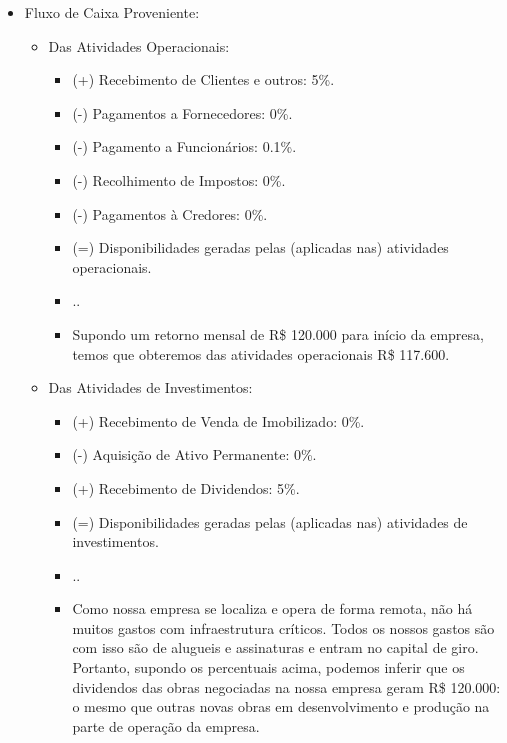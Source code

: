 \documentclass[onecolumn,12pt]{asme2ej}
\begin{document}
\begin{itemize}

    \item Fluxo de Caixa Proveniente:
    \begin{itemize}
    
        \item Das Atividades Operacionais:
        \begin{itemize}
            \item (+) Recebimento de Clientes e outros: 5\%.
            \item (-) Pagamentos a Fornecedores: 0\%.
            \item (-) Pagamento a Funcionários: 0.1\%.
            \item (-) Recolhimento de Impostos: 0\%.
            \item (-) Pagamentos à Credores: 0\%.
            \item (=) Disponibilidades geradas pelas (aplicadas nas) atividades operacionais.
            \item ..
            \item Supondo um retorno mensal de R\$ 120.000 para início da empresa, temos que obteremos das atividades operacionais R\$ 117.600.
        \end{itemize}
        
        \item Das Atividades de Investimentos:
        \begin{itemize}
            \item (+) Recebimento de Venda de Imobilizado: 0\%.
            \item (-) Aquisição de Ativo Permanente: 0\%.
            \item (+) Recebimento de Dividendos: 5\%.
            \item (=) Disponibilidades geradas pelas (aplicadas nas) atividades de investimentos.
            \item ..
            \item Como nossa empresa se localiza e opera de forma remota, não há muitos gastos com infraestrutura críticos. Todos os nossos gastos são com isso são de alugueis e assinaturas e entram no capital de giro. Portanto, supondo os percentuais acima, podemos inferir que os dividendos das obras negociadas na nossa empresa geram R\$ 120.000: o mesmo que outras novas obras em desenvolvimento e produção na parte de operação da empresa.
        \end{itemize}
    

\end{itemize}
\end{itemize}
\end{document}
